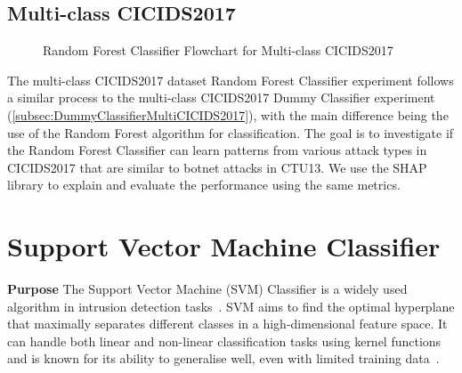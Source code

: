 \subsection{Multi-class CICIDS2017}\label{subsec:RandomForestMultiCICIDS2017}
\begin{figure}[H]
\centering
{}
\caption{Random Forest Classifier Flowchart for Multi-class CICIDS2017}\label{fig:RandomForestFlowMultiCICIDS2017}
\end{figure}

The multi-class CICIDS2017 dataset Random Forest Classifier experiment follows a similar process to the multi-class CICIDS2017 Dummy Classifier experiment (\ref{subsec:DummyClassifierMultiCICIDS2017}), with the main difference being the use of the Random Forest algorithm for classification. The goal is to investigate if the Random Forest Classifier can learn patterns from various attack types in CICIDS2017 that are similar to botnet attacks in CTU13. We use the SHAP library to explain and evaluate the performance using the same metrics.

\section{Support Vector Machine Classifier}\label{sec:SVMClassifier}

\textbf{Purpose} The Support Vector Machine (SVM) Classifier is a widely used algorithm in intrusion detection tasks~\cite{cortes1995support, scholkopf2002learning}. SVM aims to find the optimal hyperplane that maximally separates different classes in a high-dimensional feature space. It can handle both linear and non-linear classification tasks using kernel functions and is known for its ability to generalise well, even with limited training data~\cite{kim2003network, teng2017svm}.

